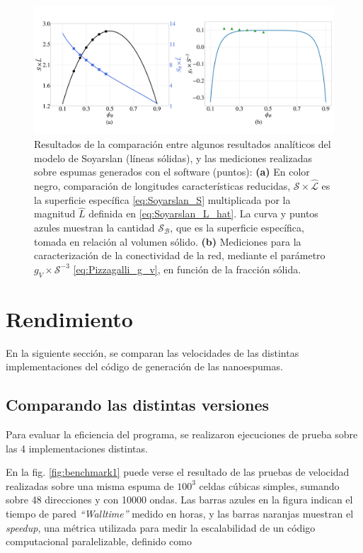 \documentclass{article}
\begin{document}
\begin{figure}[h]
    \centering
    \includegraphics[width=\textwidth]{figs/Soyarslan_2Plots.jpg}
    \caption{Resultados de la comparación entre algunos resultados analíticos del modelo de Soyarslan (líneas sólidas), y las mediciones realizadas sobre espumas generados con el software (puntos): \textbf{(a)} En color negro, comparación de longitudes características reducidas, $\mathcal{S\times\hat{L}}$ es la superficie específica \eqref{eq:Soyarslan_S} multiplicada por la magnitud $\hat{L}$ definida en \eqref{eq:Soyarslan_L_hat}. La curva y puntos azules muestran la cantidad $\mathcal{S_B}$, que es la superficie específica, tomada en relación al volumen sólido. \textbf{(b)} Mediciones para la caracterización de la conectividad de la red, mediante el parámetro $g_V\times\mathcal{S}^{-3}$ \eqref{eq:Pizzagalli_g_v}, en función de la fracción sólida.}
    \label{fig:Soyarslan_2plots}
\end{figure}

\section{Rendimiento} \label{sec:4.1.3}

En la siguiente sección, se comparan las velocidades de las distintas implementaciones del código de generación de las nanoespumas. 

\subsection{Comparando las distintas versiones}
Para evaluar la eficiencia del programa, se realizaron ejecuciones de prueba sobre las 4 implementaciones distintas. 

En la fig. \ref{fig:benchmark1} puede verse el resultado de las pruebas de velocidad realizadas sobre una misma espuma de $100^3$ celdas cúbicas simples, sumando sobre 48 direcciones y con 10000 ondas. Las barras azules en la figura indican el tiempo de pared \textit{``Walltime''} medido en horas, y las barras naranjas muestran el \textit{speedup}, una métrica utilizada para medir la escalabilidad de un código computacional paralelizable, definido como
\end{document}
